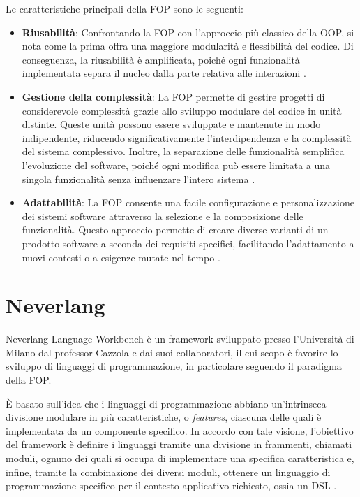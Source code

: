 \documentclass[12pt,a4paper,openright,twoside]{book}
\begin{document}
Le caratteristiche principali della \ac{FOP} sono le seguenti:
\begin{itemize}
    \item \textbf{Riusabilità}: Confrontando la \ac{FOP} con l’approccio più classico della \ac{OOP}, si nota come la prima offra una maggiore 
    modularità e flessibilità del codice. Di conseguenza, la riusabilità è amplificata, poiché ogni funzionalità implementata separa il nucleo 
    dalla parte relativa alle interazioni \cite{Prehofer1997}.
    \item \textbf{Gestione della complessità}: La \ac{FOP} permette di gestire progetti di considerevole complessità grazie allo sviluppo 
    modulare del codice in unità distinte. Queste unità possono essere sviluppate e mantenute in modo indipendente, riducendo significativamente 
    l’interdipendenza e la complessità del sistema complessivo. Inoltre, la separazione delle funzionalità semplifica l’evoluzione del software, 
    poiché ogni modifica può essere limitata a una singola funzionalità senza influenzare l’intero sistema \cite{Prehofer1997}.
    \item \textbf{Adattabilità}: La \ac{FOP} consente una facile configurazione e personalizzazione dei sistemi software attraverso la selezione 
    e la composizione delle funzionalità. Questo approccio permette di creare diverse varianti di un prodotto software a seconda dei requisiti 
    specifici, facilitando l’adattamento a nuovi contesti o a esigenze mutate nel tempo \cite{Apel2013}.
\end{itemize}

\section{Neverlang}
Neverlang Language Workbench è un framework sviluppato presso l’Università di Milano dal professor Cazzola e dai suoi collaboratori, il cui scopo 
è favorire lo sviluppo di linguaggi di programmazione, in particolare seguendo il paradigma della \ac{FOP}.

È basato sull’idea che i linguaggi di programmazione abbiano un’intrinseca divisione modulare in più caratteristiche, o \textit{features}, ciascuna 
delle quali è implementata da un componente specifico. In accordo con tale visione, l’obiettivo del framework è definire i linguaggi tramite una 
divisione in frammenti, chiamati moduli, ognuno dei quali si occupa di implementare una specifica caratteristica e, infine, tramite la combinazione 
dei diversi moduli, ottenere un linguaggio di programmazione specifico per il contesto applicativo richiesto, ossia un \ac{DSL} 
\cite{NeverlangWebsite}.
\end{document}
